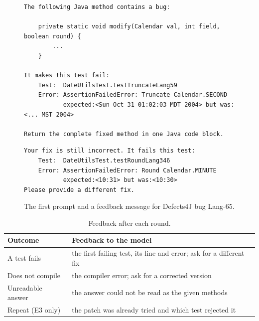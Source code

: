\begin{figure}[htbp]
\centering
\begin{minipage}{0.95\textwidth}
\begin{Verbatim}[frame=single,fontsize=\footnotesize,framesep=2mm,label=First prompt]
The following Java method contains a bug:

    private static void modify(Calendar val, int field, boolean round) {
        ...
    }

It makes this test fail:
    Test:  DateUtilsTest.testTruncateLang59
    Error: AssertionFailedError: Truncate Calendar.SECOND
           expected:<Sun Oct 31 01:02:03 MDT 2004> but was:<... MST 2004>

Return the complete fixed method in one Java code block.
\end{Verbatim}
\vspace{2mm}
\begin{Verbatim}[frame=single,fontsize=\footnotesize,framesep=2mm,label=Feedback after a rejected patch]
Your fix is still incorrect. It fails this test:
    Test:  DateUtilsTest.testRoundLang346
    Error: AssertionFailedError: Round Calendar.MINUTE
           expected:<10:31> but was:<10:30>
Please provide a different fix.
\end{Verbatim}
\end{minipage}
\caption{The first prompt and a feedback message for Defects4J bug Lang-65.}
\label{fig:exp-prompt}
\end{figure}

\begin{table}[htbp]
\centering
\caption{Feedback after each round.}
\label{tab:exp-prompts}
\footnotesize
\begin{tabularx}{\textwidth}{@{}>{\raggedright\arraybackslash}p{} >{\raggedright\arraybackslash}X@{}}
\toprule
Outcome & Feedback to the model\\
\midrule
A test fails & the first failing test, its line and error; ask for a different fix\\
Does not compile & the compiler error; ask for a corrected version\\
Unreadable answer & the answer could not be read as the given methods\\
Repeat (E3 only) & the patch was already tried and which test rejected it\\
\bottomrule
\end{tabularx}
\end{table}

